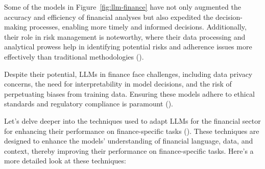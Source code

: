 Some of the models in Figure~\ref{fig:llm-finance} have not only augmented the accuracy and efficiency of financial analyses but also expedited the decision-making processes, enabling more timely and informed decisions.
Additionally, their role in risk management is noteworthy, where their data processing and analytical prowess help in identifying potential risks and adherence issues more effectively than traditional methodologies (\textcite{buehler2018deep}).

Despite their potential, LLMs in finance face challenges, including data privacy concerns, the need for interpretability in model decisions, and the risk of perpetuating biases from training data.
Ensuring these models adhere to ethical standards and regulatory compliance is paramount (\textcite{jones2020ethical, buehler2018deep}).

Let's delve deeper into the techniques used to adapt LLMs for the financial sector for enhancing their performance on finance-specific tasks (\textcite{lee2024survey}).
These techniques are designed to enhance the models' understanding of financial language, data, and context, thereby improving their performance on finance-specific tasks.
Here's a more detailed look at these techniques:


